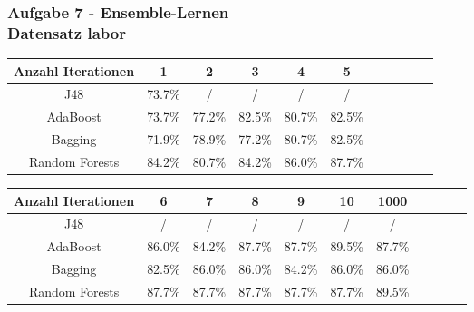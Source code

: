 \documentclass[accentcolor=tud10b,colorbacktitle,inverttitle,landscape,german,presentation,t]{tudbeamer}
\begin{document}
    \begin{frame}[t]
    \frametitle{Aufgabe 7 - Ensemble-Lernen\\ Datensatz labor}
        \begin{tabular}{|c||c|c|c|c|c|c|c|c|c|c|}
        \hline 
        Anzahl Iterationen & 1 & 2 & 3 & 4 & 5 \\ 
        \hline 
        J48 & 73.7\% & / & / & / & / \\ 
        \hline 
        AdaBoost & 73.7\% & 77.2\% & 82.5\% & 80.7\% & 82.5\% \\ 
        \hline 
        Bagging & 71.9\% & 78.9\% & 77.2\% & 80.7\% & 82.5\% \\ 
        \hline 
        Random Forests & 84.2\% & 80.7\% & 84.2\% & 86.0\% & 87.7\% \\ 
        \hline 
        \end{tabular}
        
        \begin{tabular}{|c||c|c|c|c|c|c|c|c|c|c|}
        \hline 
        Anzahl Iterationen & 6 & 7 & 8 & 9 & 10 & 1000 \\ 
        \hline 
        J48 & / & / & / & / & / & /\\ 
        \hline 
        AdaBoost & 86.0\% & 84.2\% & 87.7\% & 87.7\% & 89.5\% & 87.7\% \\ 
        \hline 
        Bagging & 82.5\% & 86.0\% & 86.0\% & 84.2\% & 86.0\% & 86.0\% \\ 
        \hline 
        Random Forests & 87.7\% & 87.7\% & 87.7\% & 87.7\% & 87.7\% & 89.5\% \\ 
        \hline 
        \end{tabular} 
    \end{frame}  
    
\end{document}
